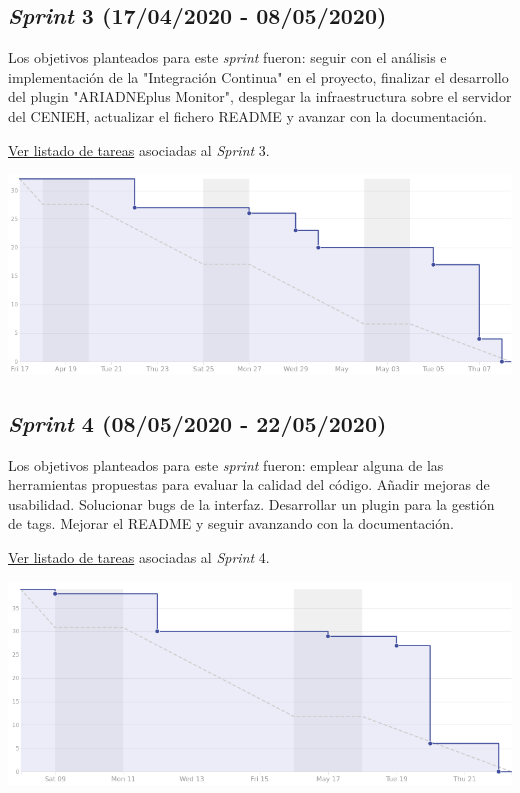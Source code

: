 \documentclass[
]{article}
\begin{document}
\hypertarget{sprint-3-17042020---08052020}{%
\subsection{\texorpdfstring{\emph{Sprint} 3 (17/04/2020 -
08/05/2020)}{Sprint 3 (17/04/2020 - 08/05/2020)}}\label{sprint-3-17042020---08052020}}

Los objetivos planteados para este \emph{sprint} fueron: seguir con el
análisis e implementación de la "Integración Continua" en el proyecto,
finalizar el desarrollo del plugin "ARIADNEplus Monitor", desplegar la
infraestructura sobre el servidor del CENIEH, actualizar el fichero
README y avanzar con la documentación.

\href{https://github.com/gcm1001/TFG-CeniehAriadne/milestone/4}{Ver
listado de tareas} asociadas al \emph{Sprint} 3.

\includegraphics{../_static/images/sprint03.png}

\hypertarget{sprint-4-08052020---22052020}{%
\subsection{\texorpdfstring{\emph{Sprint} 4 (08/05/2020 -
22/05/2020)}{Sprint 4 (08/05/2020 - 22/05/2020)}}\label{sprint-4-08052020---22052020}}

Los objetivos planteados para este \emph{sprint} fueron: emplear alguna
de las herramientas propuestas para evaluar la calidad del código.
Añadir mejoras de usabilidad. Solucionar bugs de la interfaz.
Desarrollar un plugin para la gestión de tags. Mejorar el README y
seguir avanzando con la documentación.

\href{https://github.com/gcm1001/TFG-CeniehAriadne/milestone/5}{Ver
listado de tareas} asociadas al \emph{Sprint} 4.

\includegraphics{../_static/images/sprint04.png}
\end{document}
